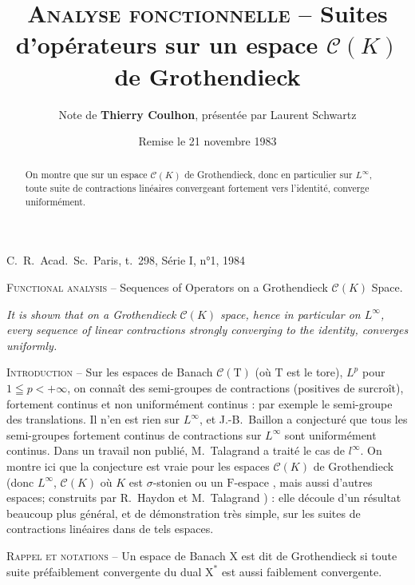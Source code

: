 \documentclass{article}
\title{\textsc{Analyse fonctionnelle} -- Suites d'opérateurs sur un espace $\mathscr{C}(K)$ de Grothendieck}
\author{Note de \textbf{Thierry Coulhon}, présentée par Laurent Schwartz}
\date{Remise le 21 novembre 1983}
\theoremstyle{plain}
\begin{document}
	
\noindent
C.\ R.\ Acad.\ Sc.\ Paris, t.\ 298, Série I, n°1, 1984

{\let\newpage\relax\maketitle}

\maketitle

\renewcommand*\abstractname{}

\begin{abstract}
	On montre que sur un espace $\mathscr{C}(K)$ de Grothendieck, donc en particulier sur $L^\infty$, toute suite de contractions
	linéaires convergeant fortement vers l'identité, converge uniformément.
\end{abstract}

\bigskip

\textsc{Functional analysis} -- Sequences of Operators on a Grothendieck $\mathscr{C}(K)$ Space.

\emph{It is shown that on a Grothendieck $\mathscr{C}(K)$ space, hence in particular on $L^\infty$, every sequence of linear contractions
strongly converging to the identity, converges uniformly.}

\bigskip

\textsc{Introduction} -- Sur les espaces de Banach $\mathscr{C}(\mathrm{T})$ (où $\mathrm{T}$ est le tore), $L^{p}$ pour $1 \leqq p<+\infty$, on connaît des semi-groupes de contractions (positives de surcroît), fortement continus et non uniformément continus : par exemple le semi-groupe des translations. Il n'en est rien sur $L^{\infty}$, et J.-B.\ Baillon a conjecturé que tous les semi-groupes fortement continus de contractions sur $L^{\infty}$ sont uniformément continus. Dans un travail non publié, M.\ Talagrand a traité le cas de $l^{\infty}$. On montre ici que la conjecture est vraie pour les espaces $\mathscr{C}(K)$ de Grothendieck (donc $L^{\infty}$, $\mathscr{C}(K)$ où $K$ est $\sigma$-stonien ou un $\mathrm{F}$-espace \cite{1}, mais aussi d'autres espaces; construits par R.\ Haydon \cite{2} et M.\ Talagrand \cite{3}) : elle découle d'un résultat beaucoup plus général, et de démonstration très simple, sur les suites de contractions linéaires dans de tels espaces.

\bigskip

\textsc{Rappel et notations} -- Un espace de Banach $\mathrm{X}$ est dit de Grothendieck si toute suite préfaiblement convergente du dual $\mathrm{X}^{*}$ est aussi faiblement convergente.
\end{document}
